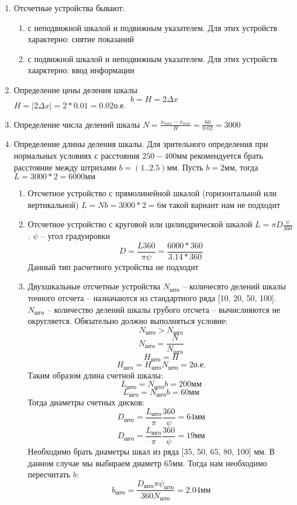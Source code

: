 \documentclass{article}
\begin{document}
\begin{enumerate}
	\item Отсчетные устройства бывают:
	\begin{enumerate}
		\item с неподвижной шкалой и подвижным указателем. Для этих устройств характерно: снятие показаний
		\item с подвижной шкалой и неподвижным указателем. Для этих устройств хаарктерно: ввод информации
	\end{enumerate}
	\item Определение цены деления шкалы
	$$
	b = H = 2 \Delta x
	$$
	$H = | 2 \Delta x| = 2 * 0.01 = 0.02 о. е.$
	\item Определение числа делений шкалы $N = \frac{x_{max} - x_{min}}{H} = \frac{60}{0.02} = 3000$
	\item Определение длины деления шкалы. Для зрительного определения при нормальных условиях с расстояния $250-400 мм$ рекомендуется брать расстояние между штрихами $b = (1..2.5) мм$. Пусть $b = 2 мм$, тогда $L = 3000 * 2 = 6000 мм$ 
	\begin{enumerate}
		\item Отсчетное устройство с прямолинейной шкалой (горизонтальной или вертикальной) $L = N b = 3000 * 2 = 6 м$ такой вариант нам не подходит
		\item Отсчетное устройство с круговой или цилиндрической шкалой $L = \pi D \frac{ \psi}{360} $. $ \psi$ -- угол градуировки
		$$
		D = \frac{L 360}{ \pi \psi}  = \frac{6000 * 360}{3.14 * 360} 
		$$
		Данный тип расчетного устройства не подходит
		\item Двухшкальные отсчетные устройства $N_{што}$ -- количесвто делений шкалы точного отсчета -- назначаются из стандартного ряда [10, 20, 50, 100]. $N_{шго}$ -- количество делений шкалы грубого отсчета -- вычислияются не округляется. Обязательно должно выполняться условие:
		$$
		N_{што} > N_{шго}
		$$
		$$
		N_{што} = \frac{N}{N_{шго}} 
		$$
		$$
		H_{што} = H
		$$
		$$
		H_{шго} = H_{што} N_{што} = 2 о. е.
		$$
		Таким образом длина счетной шкалы:
		$$
		L_{што} = N_{што} b = 200мм
		$$
		$$
		L_{шго} = N_{шго} b = 60 мм
		$$
		Тогда диаметры счетных дисков:
		$$
		D_{што} = \frac{L_{што}}{ \pi} \frac{360}{ \psi} = 64 мм
		$$
		$$
		D_{шго} = \frac{L_{шго}}{\pi} \frac{360}{ \psi} = 19 мм
		$$
		Необходимо брать диаметры шкал из ряда [35, 50, 65, 80, 100] мм. В данном случае мы выбираем диаметр 65мм. Тогда нам необходимо пересчитать $b$:
		$$
		b_{што} = \frac{D_{што} \pi \psi_{што}}{360 N_{што}} =  2.04 мм\label{b1}
		$$


\end{enumerate}
\end{enumerate}
\end{document}
